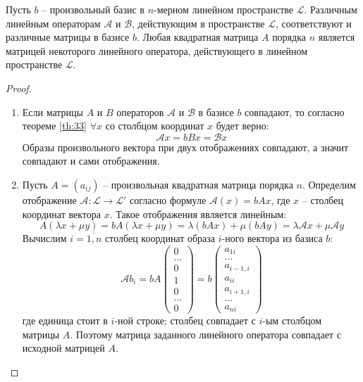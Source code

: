 \begin{theorem}
  \label{th:34}
  Пусть $b$ -- произвольный базис в $n$-мерном линейном пространстве $\mathcal{L}$. Различным линейным операторам $\mathcal{A}$ и $\mathcal{B}$, действующим в пространстве $\mathcal{L}$, соответствуют и различные матрицы в базисе $b$. Любая квадратная матрица $A$ порядка $n$ является матрицей некоторого линейного оператора, действующего в линейном пространстве $\mathcal{L}$.
\end{theorem}
\begin{proof}
  \nobreakspace
  \begin{enumerate}
    \item Если матрицы $A$ и $B$ операторов $\mathcal{A}$ и $\mathcal{B}$ в базисе $b$ совпадают, то согласно теореме \ref{th:33} $\forall x$ со столбцом координат $x$ будет верно:  \[
    \mathcal{A}x = bBx = \mathcal{B}x
  \] 
  Образы произвольного вектора при двух отображениях совпадают, а значит совпадают и сами отображения.

    \item Пусть $A = (a_{ij})$ -- произвольная квадратная матрица порядка $n$. Определим отображение  $\mathcal{A}: \mathcal{L} \to \mathcal{L}'$ согласно формуле $\mathcal{A}(x) = bAx$, где $x$ -- столбец координат вектора $x$. Такое отображения является линейным: \[
      A(\lambda x + \mu y) = bA(\lambda x + \mu y) = \lambda(b A x) + \mu(b A y) = \lambda \mathcal{A} x + \mu \mathcal{A} y
    \] 
    Вычислим $i = \overline{1, n}$ столбец координат образа  $i$-ного вектора из базиса  $b$: \[
    \mathcal{A}b_i = bA
    \begin{pmatrix}
      0 \\ \ldots \\ 0 \\ 1 \\ 0 \\ \ldots \\ 0
    \end{pmatrix}
    = b
    \begin{pmatrix}
      a_{1i} \\ \ldots \\ a_{i-1,i} \\ a_{ii} \\ a_{i+1,i} \\ \ldots \\ a_{ni}
    \end{pmatrix}
    \] 
    где единица стоит в $i$-ной строке; столбец совпадает с $i$-ым столбцом матрицы $A$.
    Поэтому матрица заданного линейного оператора совпадает с исходной матрицей $A$.
  \end{enumerate}
\end{proof}

